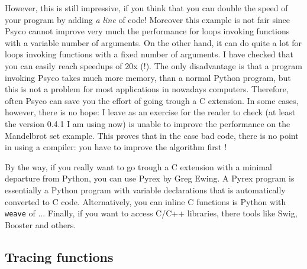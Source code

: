 \documentclass[10pt,english]{article}
\begin{document}
However, this is still impressive, if you think that you can double 
the speed of your program by adding \emph{a line} of code! Moreover this
example is not fair since Psyco cannot improve very much the performance 
for loops invoking functions with a variable number of arguments. On the
other hand, it can do quite a lot for loops invoking functions with 
a fixed number of arguments. I have checked that you can easily reach 
speedups of 20x (!). The only disadvantage is that a program invoking
Psyco takes much more memory, than a normal Python program, but this
is not a problem for most applications in nowadays computers. 
Therefore, often Psyco
can save you the effort of going trough a C extension. In some cases,
however, there is no hope: I leave as an exercise for the reader
to check (at least the version 0.4.1 I am using now) is unable to
improve the performance on the Mandelbrot set example. This proves
that in the case bad code, there is no point in using a compiler:
you have to improve the algorithm first !

By the way, if you really want to go trough a C extension with a minimal
departure from Python, you can use Pyrex by Greg Ewing. A Pyrex program
is essentially a Python program with variable declarations that is
automatically converted to C code. Alternatively, you can inline
C functions is Python with \texttt{weave} of ... 
Finally, if you want to access C/C++ libraries, there tools
like Swig, Booster and others.



\hypertarget{tracing-functions}{}
\subsection*{Tracing functions}
\end{document}
